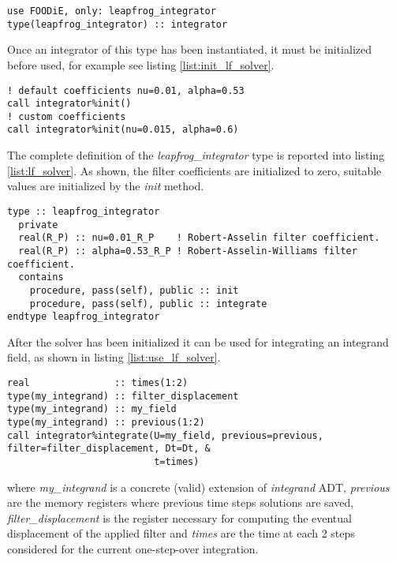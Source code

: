 \documentclass[pdftex,preprint,3p,times,numbers]{elsarticle}
\begin{document}
\begin{lstlisting}[firstnumber=1,style=code,caption={definition of an explicit Leapfrog integrator},label={list:define_lf_solver}]
use FOODiE, only: leapfrog_integrator
type(leapfrog_integrator) :: integrator
\end{lstlisting}

Once an integrator of this type has been instantiated, it must be initialized before used, for example see listing \ref{list:init_lf_solver}.

\begin{lstlisting}[firstnumber=1,style=code,caption={example of initialization of an explicit Leapfrog integrator},label={list:init_lf_solver}]
! default coefficients nu=0.01, alpha=0.53
call integrator%init()
! custom coefficients
call integrator%init(nu=0.015, alpha=0.6)
\end{lstlisting}

The complete definition of the \emph{leapfrog\_integrator} type is reported into listing \ref{list:lf_solver}. As shown, the filter coefficients are initialized to zero, suitable values are initialized by the \emph{init} method.

\begin{lstlisting}[firstnumber=1,style=code,caption={definition of \emph{leapfrog\_integrator} type},label={list:lf_solver}]
type :: leapfrog_integrator
  private
  real(R_P) :: nu=0.01_R_P    ! Robert-Asselin filter coefficient.
  real(R_P) :: alpha=0.53_R_P ! Robert-Asselin-Williams filter coefficient.
  contains
    procedure, pass(self), public :: init
    procedure, pass(self), public :: integrate
endtype leapfrog_integrator
\end{lstlisting}

After the solver has been initialized it can be used for integrating an integrand field, as shown in listing \ref{list:use_lf_solver}.

\begin{lstlisting}[firstnumber=1,style=code,caption={example of usage of a Leapfrog integrator},label={list:use_lf_solver}]
real               :: times(1:2)
type(my_integrand) :: filter_displacement
type(my_integrand) :: my_field
type(my_integrand) :: previous(1:2)
call integrator%integrate(U=my_field, previous=previous, filter=filter_displacement, Dt=Dt, &
                          t=times)
\end{lstlisting}
where \emph{my\_integrand} is a concrete (valid) extension of \emph{integrand} ADT, \emph{previous} are the memory registers where previous time steps solutions are saved, \emph{filter\_displacement} is the register necessary for computing the eventual displacement of the applied filter and \emph{times} are the time at each 2 steps considered for the current one-step-over integration.
\end{document}
